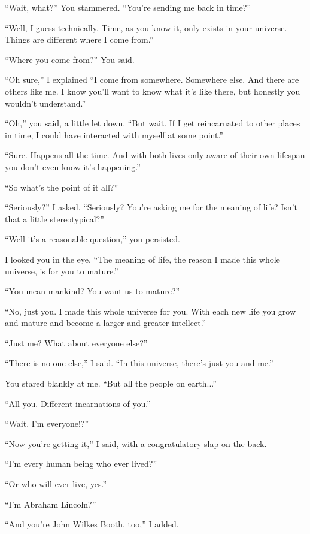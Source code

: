 “Wait, what?” You stammered. “You're sending me back in time?”

“Well, I guess technically. Time, as you know it, only exists in your universe. Things are different where I come from.”

“Where you come from?” You said.

“Oh sure,” I explained “I come from somewhere. Somewhere else. And there are others like me. I know you'll want to know what it's like there, but honestly you wouldn't understand.”

“Oh,” you said, a little let down. “But wait. If I get reincarnated to other places in time, I could have interacted with myself at some point.”

“Sure. Happens all the time. And with both lives only aware of their own lifespan you don't even know it's happening.”

“So what's the point of it all?”


“Seriously?” I asked. “Seriously? You're asking me for the meaning of life? Isn't that a little stereotypical?”

“Well it's a reasonable question,” you persisted.

I looked you in the eye. “The meaning of life, the reason I made this whole universe, is for you to mature.”

“You mean mankind? You want us to mature?”

“No, just you. I made this whole universe for you. With each new life you grow and mature and become a larger and greater intellect.”

“Just me? What about everyone else?”

“There is no one else,” I said. “In this universe, there's just you and me.”

You stared blankly at me. “But all the people on earth...”

“All you. Different incarnations of you.”

“Wait. I'm everyone!?”


“Now you're getting it,” I said, with a congratulatory slap on the back.

“I'm every human being who ever lived?”

“Or who will ever live, yes.”

“I'm Abraham Lincoln?”

“And you're John Wilkes Booth, too,” I added.

